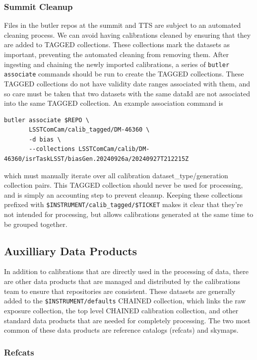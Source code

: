 \documentclass[DM,authoryear,toc]{lsstdoc}
\begin{document}
\subsubsection{Summit Cleanup}

Files in the butler repos at the summit and TTS are subject to an automated cleaning process.
We can avoid having calibrations cleaned by ensuring that they are added to TAGGED collections.
These collections mark the datasets as important, preventing the automated cleaning from removing them.
After ingesting and chaining the newly imported calibrations, a series of \verb|butler associate| commands should be run to create the TAGGED collections.
These TAGGED collections do not have validity date ranges associated with them, and so care must be taken that two datasets with the same dataId are not associated into the same TAGGED collection.
An example association command is
\begin{verbatim}
butler associate $REPO \
       LSSTComCam/calib_tagged/DM-46360 \
       -d bias \
       --collections LSSTComCam/calib/DM-46360/isrTaskLSST/biasGen.20240926a/20240927T212215Z
\end{verbatim}
which must manually iterate over all calibration dataset\_type/generation collection pairs.
This TAGGED collection should never be used for processing, and is simply an accounting step to prevent cleanup.
Keeping these collections prefixed with \verb|$INSTRUMENT/calib_tagged/$TICKET| makes it clear that they're not intended for processing, but allows calibrations generated at the same time to be grouped together.

\subsection{Auxilliary Data Products}

In addition to calibrations that are directly used in the processing of data, there are other data products that are managed and distributed by the calibrations team to ensure that repositories are consistent.
These datasets are generally added to the \verb|$INSTRUMENT/defaults| CHAINED collection, which links the raw exposure collection, the top level CHAINED calibration collection, and other standard data products that are needed for completely processing.
The two most common of these data products are reference catalogs (refcats) and skymaps.

\subsubsection{Refcats}
\end{document}
